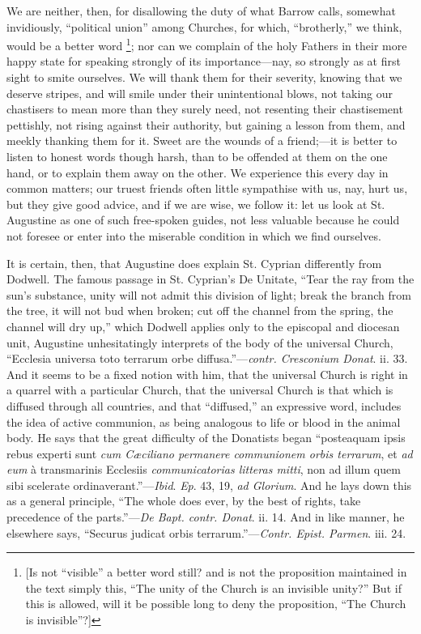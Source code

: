 We are neither, then, for disallowing the duty of
what Barrow calls, somewhat invidiously, ``political union'' among
Churches, for which, ``brotherly,'' we think, would be a better word \footnote{[Is not ``visible'' a better word still? and is not the proposition
maintained in the text simply this, ``The unity of the Church is an
invisible unity?'' But if this is allowed, will it be possible long to
deny the proposition, ``The Church is invisible''?]}; nor can we complain of the holy Fathers in their more happy
state for speaking strongly of its importance—nay, so strongly as at
first sight to smite ourselves. We will thank them for their severity,
knowing that we deserve stripes, and will smile under their
unintentional blows, not taking our chastisers to mean more than they
surely need, not resenting their chastisement pettishly, not rising
against their authority, but gaining a lesson from them, and meekly
thanking them for it. Sweet are the wounds of a friend;—it is better
to listen to honest words though harsh, than to be offended at them on
the one hand, or to explain them away on the other. We experience this
every day in common matters; our truest friends often little
sympathise with us, nay, hurt us, but they give good advice, and
if we are wise, we follow it: let us look at St. Augustine as one of
such free-spoken guides, not less valuable because he could not
foresee or enter into the miserable condition in which we find
ourselves.

It is certain, then, that Augustine does explain
St. Cyprian differently from Dodwell. The famous passage in St.
Cyprian's De Unitate, ``Tear the ray from the sun's substance, unity
will not admit this division of light; break the branch from the tree,
it will not bud when broken; cut off the channel from the spring, the
channel will dry up,'' which Dodwell applies only to the episcopal and
diocesan unit, Augustine unhesitatingly interprets of the body of the
universal Church, ``Ecclesia universa toto terrarum orbe diffusa.''—\emph{contr.
Cresconium Donat}. ii. 33. And it seems to be a fixed notion with
him, that the universal Church is right in a quarrel with a particular
Church, that the universal Church is that which is diffused through
all countries, and that ``diffused,'' an expressive word, includes the
idea of active communion, as being analogous to life or blood in the
animal body. He says that the great difficulty of the Donatists began ``posteaquam
ipsis rebus experti sunt \emph{cum Cæciliano permanere communionem orbis
terrarum}, et \emph{ad eum} à transmarinis Ecclesiis \emph{communicatorias
litteras mitti}, non ad illum quem sibi scelerate ordinaverant.''—\emph{Ibid}.
\emph{Ep}. 43, 19, \emph{ad Glorium}. And he lays down this as a
general principle, ``The whole does ever, by the best of rights, take
precedence of the parts.''—\emph{De Bapt. contr. Donat}. ii. 14. And
in like manner, he elsewhere says, ``Securus judicat orbis terrarum.''—\emph{Contr.
Epist. Parmen}. iii. 24.

